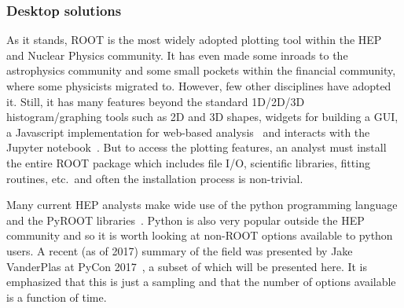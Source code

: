\documentclass[12pt,a4paper]{article}
\begin{document}
\hypertarget{stats-desktop}{%
\subsubsection{Desktop solutions}\label{stats-desktop}}

As it stands, ROOT is the most widely adopted plotting tool within the HEP and Nuclear Physics community.
It has even made some inroads to the astrophysics community and some small pockets within the financial community,
where some physicists migrated to. However, few other disciplines have adopted it. Still, it has many features beyond
the standard 1D/2D/3D histogram/graphing tools such as 2D and 3D shapes, widgets for building a GUI, a Javascript
implementation for web-based analysis~\cite{rootjs} and interacts with the Jupyter notebook~\cite{JupyterNotebook}. But to
access the plotting features, an analyst must install the entire ROOT package which includes file I/O, scientific
libraries, fitting routines, etc.\ and often the installation process is non-trivial.

Many current HEP analysts make wide use of the python programming language and the PyROOT libraries~\cite{PyROOT}.
Python is also very popular outside the HEP community and so it is worth looking at non-ROOT options available to python users.
A recent (as of 2017) summary of the field was presented by Jake VanderPlas at PyCon 2017~\cite{VanderPlas2017}, a subset
of which will be presented here. It is emphasized that this is just a sampling and that the number of options available
is a function of time.
\end{document}
